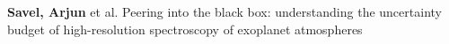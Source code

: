 


\item[{\color{numcolor}\scriptsize1}] \textbf{Savel, Arjun} et al. Peering into the black box: understanding the uncertainty budget of high-resolution spectroscopy of exoplanet atmospheres